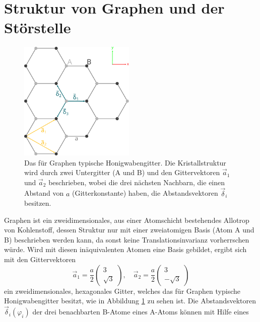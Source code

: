 \section{Struktur von Graphen und der Störstelle}
\label{sec:structure}
\begin{figure}
    \centering
    \includegraphics[width = 0.49\textwidth]{Plots/graphene_lattice.pdf}
    \caption{Das für Graphen typische Honigwabengitter. Die Kristallstruktur wird durch zwei Untergitter (A und B) und den 
    Gittervektoren $\vec{a}_1$ und $\vec{a}_2$ beschrieben, wobei
    die drei nächsten Nachbarn, die einen Abstand von $a$ (Gitterkonstante) haben, die Abstandsvektoren $\vec{\delta}_i$ besitzen.}
    \label{fig:graphene_lattice}
\end{figure}
Graphen ist ein zweidimensionales, aus einer Atomschicht bestehendes Allotrop von Kohlenstoff, dessen
Struktur nur mit einer zweiatomigen Basis (Atom A und B) beschrieben werden kann, da sonst keine Translationsinvarianz vorherrschen würde.
Wird mit diesen inäquivalenten Atomen eine Basis gebildet, ergibt sich mit den Gittervektoren 
\begin{equation*}
        \vec{a}_1 = \frac{a}{2}\begin{pmatrix} 3 \\[4pt] \sqrt{3}  \end{pmatrix}, \quad
        \vec{a}_2 = \frac{a}{2}\begin{pmatrix} 3 \\[4pt] -\sqrt{3} \end{pmatrix}       
\end{equation*}    
ein zweidimensionales, hexagonales Gitter, welches das für Graphen typische Honigwabengitter besitzt,
wie in Abbildung \ref{fig:graphene_lattice} zu sehen ist.
Die Abstandsvektoren $\vec{\delta}_i(\varphi_i)$ der drei benachbarten B-Atome eines A-Atoms können mit Hilfe eines 
